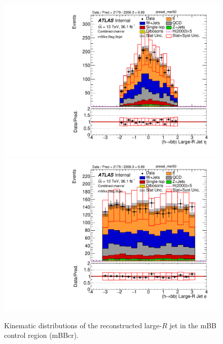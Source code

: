 \begin{figure}[!h]
\begin{center}
\includegraphics[scale=0.33]{./figures/boosted/PlotsInMbbCR/DataMC_2tag_0bjet_mbbcr_lepton_presel_met50_HbbEta} 
\includegraphics[scale=0.33]{./figures/boosted/PlotsInMbbCR/DataMC_2tag_0bjet_mbbcr_lepton_presel_met50_HbbPhi} 
\caption{Kinematic distributions of the reconstructed large-$R$ jet in the mBB control region (mBBcr).}
\label{fig:boosted_mbbcr_largerjet}
\end{center}
\end{figure}
 
